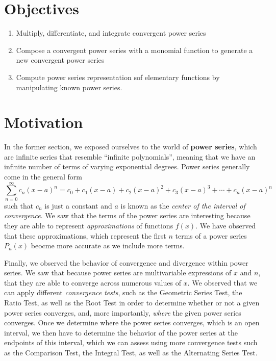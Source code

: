 \section{Objectives}
\begin{enumerate}
  \item Multiply, differentiate, and integrate
        convergent power series
  \item Compose a convergent power series with a
        monomial function to generate a new convergent
        power series
  \item Compute power series representation sof
        elementary functions by manipulating known
        power series.
\end{enumerate}

\section{Motivation}
In the former section, we exposed ourselves to the
world of \textbf{power series}, which are infinite series
that resemble ``infinite polynomials'', meaning that
we have an infinite number of terms of varying
exponential degrees. Power series generally come in the
general form
\[ \sum_{n=0}^{\infty} c_{n} (x-a)^{n} =
  c_{0} + c_{1}(x-a) + c_{2}(x-a)^{2} + c_{3}(x-a)^{3} +
  \cdots + c_{n}(x-a)^{n}\]
such that $ c_{n}$ is just a constant and $ a $ is known
as the \textit{center of the interval of convergence}.
We saw that the terms of the power series are interesting
because they are able to represent \textit{approximations} of
functions $ f(x)$. We have observed that these approximations,
which represent the first $n$ terms of a power series $ P_{n}(x)$
beocme more accurate as we include more terms.
\par Finally, we observed the behavior of convergence
and divergence within power series. We saw that because
power series are multivariable expressions of $ x $ and $ n $,
that they are able to converge across numerous values of $ x $.
We observed that we can apply different \textit{convergence
  tests}, such as the Geometric Series Test, the Ratio Test,
as well as the Root Test in order to determine whether or not
a given power series converges, and, more importantly,
\textit{where} the given power series converges. Once
we determine where the power series converges, which is
an open interval, we then have to determine the behavior of the
power series at the endpoints of this interval, which we
can assess using more convergence tests such as the
Comparison Test, the Integral Test, as well as the Alternating
Series Test.

